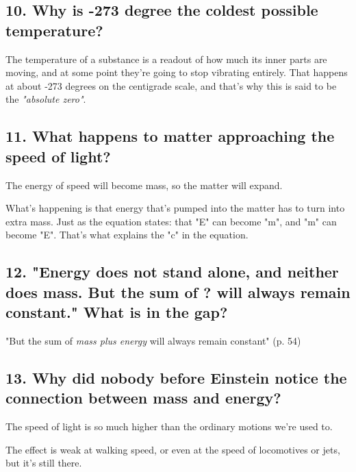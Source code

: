 \subsection*{10. Why is -273 degree the coldest possible temperature?}
The temperature of a substance is a readout of how much its inner parts are moving, and at some point they're going to stop vibrating entirely. That happens at about -273 degrees on the centigrade scale, and that's why this is said to be the \emph{"absolute zero"}.

\subsection*{11. What happens to matter approaching the speed of light?}
The energy of speed will become mass, so the matter will expand.

What's happening is that energy that's pumped into the matter has to turn into extra mass. Just as the equation states: that "E" can become "m", and "m" can become "E". That's what explains the "c" in the equation.

\subsection*{12. "Energy does not stand alone, and neither does mass. But the sum of ? will always remain constant." What is in the gap?}
"But the sum of \emph{mass plus energy} will always remain constant" (p. 54)

\subsection*{13. Why did nobody before Einstein notice the connection between mass and energy?}
The speed of light is so much higher than the ordinary motions we're used to.

The effect is weak at walking speed, or even at the speed of locomotives or jets, but it's still there.